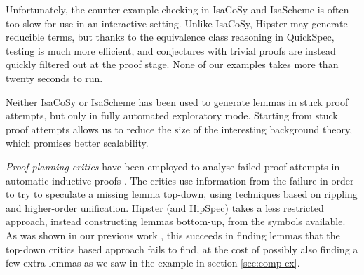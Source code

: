 Unfortunately, the counter-example checking in IsaCoSy and IsaScheme
is often too slow for use in an interactive setting. Unlike IsaCoSy,
Hipster may generate reducible terms, but thanks to the equivalence
class reasoning in QuickSpec, testing is much more efficient, and
conjectures with trivial proofs are instead quickly filtered out at
the proof stage. None of our examples takes more than twenty seconds
to run.

Neither IsaCoSy or IsaScheme has been used to generate lemmas in stuck proof attempts, but only in fully automated exploratory mode.
Starting from stuck proof attempts allows us to reduce the size of the
interesting background theory, which promises better scalability.

\emph{Proof planning critics} have been employed to analyse failed
proof attempts in automatic inductive proofs \cite{productiveuse}. The
critics use information from the failure in order to try to speculate
a missing lemma top-down, using techniques based on rippling and
higher-order unification. Hipster (and HipSpec) takes a less
restricted approach, instead constructing lemmas bottom-up, from the symbols available. As was shown in our previous work \cite{hipspecCADE}, this succeeds in finding lemmas that the top-down critics based approach fails to find, at the cost of possibly also finding a few extra lemmas as we saw in the example in section \ref{sec:comp-ex}.




